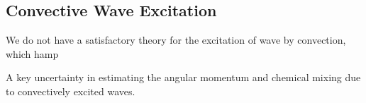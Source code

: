 {\color{purple}
\subsection{Convective Wave Excitation}
}

We do not have a satisfactory theory for the excitation of wave by convection, which hamp

A key uncertainty in estimating the angular momentum and chemical mixing due to convectively excited waves.
